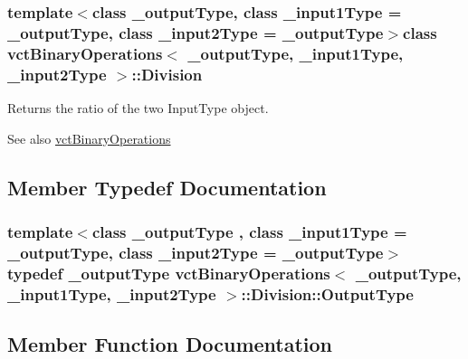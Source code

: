 \subsubsection*{template$<$class \+\_\+output\+Type, class \+\_\+input1\+Type = \+\_\+output\+Type, class \+\_\+input2\+Type = \+\_\+output\+Type$>$class vct\+Binary\+Operations$<$ \+\_\+output\+Type, \+\_\+input1\+Type, \+\_\+input2\+Type $>$\+::\+Division}

Returns the ratio of the two Input\+Type object. 

\begin{DoxySeeAlso}{See also}
\hyperlink{classvct_binary_operations}{vct\+Binary\+Operations} 
\end{DoxySeeAlso}


\subsection{Member Typedef Documentation}
\hypertarget{classvct_binary_operations_1_1_division_a3e7c6d995453d18ae82265141ae1dff0}{}
\subsubsection[{Output\+Type}]{\setlength{\rightskip}{0pt plus 5cm}template$<$class \+\_\+output\+Type , class \+\_\+input1\+Type  = \+\_\+output\+Type, class \+\_\+input2\+Type  = \+\_\+output\+Type$>$ typedef \+\_\+output\+Type {\bf vct\+Binary\+Operations}$<$ \+\_\+output\+Type, \+\_\+input1\+Type, \+\_\+input2\+Type $>$\+::{\bf Division\+::\+Output\+Type}}\label{classvct_binary_operations_1_1_division_a3e7c6d995453d18ae82265141ae1dff0}


\subsection{Member Function Documentation}
\hypertarget{classvct_binary_operations_1_1_division_a3dbdf848ff9f642f93f5d0b7fd18fa0d}{}
